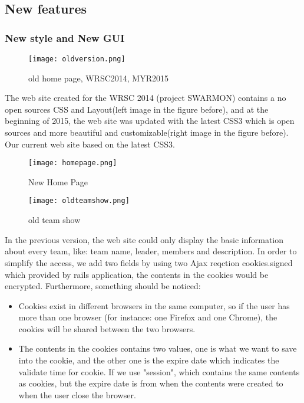 \subsection{New features}
\subsubsection{New style and New GUI}
\begin{figure}[h!]
\centering
\texttt{[image: oldversion.png]}
\caption{old home page, WRSC2014, MYR2015 }
\label{fig-sample}
\end{figure}
The web site created for the WRSC 2014 (project SWARMON) contains a no open sources CSS and Layout(left image in the figure before), and at the beginning of 2015, the web site was updated with the latest CSS3 which is open sources and more beautiful and customizable(right image in the figure before). Our current web site based on the latest CSS3.
\begin{figure}[h!]
\centering
\texttt{[image: homepage.png]}
\caption{New Home Page }
\end{figure}

\begin{figure}[h!]
\centering
\texttt{[image: oldteamshow.png]}
\caption{old team show}
\label{fig-sample}
\end{figure}
In the previous version, the web site could only display the basic information about every team, like: team name, leader, members and description. In order to simplify the access, we add two fields by using two Ajax reqction cookies.signed which provided by rails application, the contents in the cookies would be encrypted. Furthermore, something should be noticed: 
\begin{itemize}
\item Cookies exist in different browsers in the same computer, so if the user has more than one browser (for instance: one Firefox and one Chrome), the cookies will be shared between the two browsers. 
\item The contents in the cookies contains two values, one is what we want to save into the cookie, and the other one is the expire date which indicates the validate time for cookie. If we use "session", which contains the same contents as cookies, but the expire date is from when the contents were created to when the user close the browser.
\end{itemize} 

